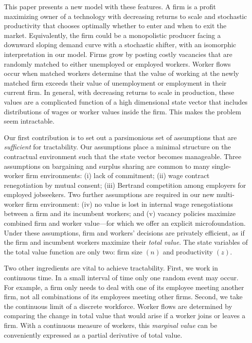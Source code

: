 This paper presents a new model with these features.
A firm is a profit maximizing owner of a technology with decreasing returns to scale and stochastic productivity that chooses optimally whether to enter and when to exit the market.
Equivalently, the firm could be a monopolistic producer facing a downward sloping demand curve with a stochastic shifter, with an isomorphic interpretation in our model.
Firms grow by posting costly vacancies that are randomly matched to either unemployed or employed workers.
Worker flows occur when matched workers determine that the value of working at the newly matched firm exceeds their value of unemployment or employment in their current firm.
In general, with decreasing returns to scale in production, these values are a complicated function of a high dimensional state vector that includes distributions of wages or worker values inside the firm.
This makes the problem seem intractable.

Our first contribution is to set out a parsimonious set of assumptions that are \emph{sufficient} for tractability.
Our assumptions place a minimal structure on the contractual environment such that the state vector becomes manageable.
Three assumptions on bargaining and surplus sharing are common to many single-worker firm environments:
(i) lack of commitment;
(ii) wage contract renegotiation by mutual consent;
(iii) Bertrand competition among employers for employed jobseekers.
Two further assumptions are required in our new multi-worker firm environment:
(iv) no value is lost in internal wage renegotiations between a firm and its incumbent workers; and
(v) vacancy policies maximize combined firm and worker value---for which we offer an explicit microfoundation.
Under these assumptions, firm and workers' decisions are privately efficient, as if the firm and incumbent workers maximize their \emph{total value}.
The state variables of the total value function are only two: firm size $\left(n\right)$ and productivity $\left(z\right)$. 

Two other ingredients are vital to achieve tractability.
First, we work in continuous time.
In a small interval of time only one random event may occur.
For example, a firm only needs to deal with one of its employee meeting another firm, not all combinations of its employees meeting other firms.
Second, we take the continuous limit of a discrete workforce.
Worker flows are determined by comparing the change in total value that would arise if a worker joins or leaves a firm.
With a continuous measure of workers, this \emph{marginal value} can be conveniently expressed as a partial derivative of total value.

